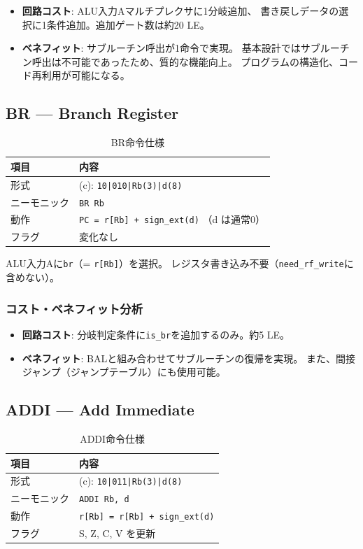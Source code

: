 \documentclass[a4paper,11pt]{ltjsarticle}
\begin{document}
\begin{itemize}
\item \textbf{回路コスト}: ALU入力Aマルチプレクサに1分岐追加、
  書き戻しデータの選択に1条件追加。追加ゲート数は約20 LE。
\item \textbf{ベネフィット}: サブルーチン呼出が1命令で実現。
  基本設計ではサブルーチン呼出は不可能であったため、質的な機能向上。
  プログラムの構造化、コード再利用が可能になる。
\end{itemize}

\subsection{BR — Branch Register}

\begin{table}[h]
\centering
\caption{BR命令仕様}
\begin{tabular}{ll}
\toprule
項目 & 内容 \\
\midrule
形式        & (c): \texttt{10|010|Rb(3)|d(8)} \\
ニーモニック & \texttt{BR Rb} \\
動作        & \texttt{PC = r[Rb] + sign\_ext(d)} （d は通常0）\\
フラグ      & 変化なし \\
\bottomrule
\end{tabular}
\end{table}

ALU入力Aに\texttt{br}（= \texttt{r[Rb]}）を選択。
レジスタ書き込み不要（\texttt{need\_rf\_write}に含めない）。

\subsubsection{コスト・ベネフィット分析}

\begin{itemize}
\item \textbf{回路コスト}: 分岐判定条件に\texttt{is\_br}を追加するのみ。約5 LE。
\item \textbf{ベネフィット}: BALと組み合わせてサブルーチンの復帰を実現。
  また、間接ジャンプ（ジャンプテーブル）にも使用可能。
\end{itemize}

\subsection{ADDI — Add Immediate}

\begin{table}[h]
\centering
\caption{ADDI命令仕様}
\begin{tabular}{ll}
\toprule
項目 & 内容 \\
\midrule
形式        & (c): \texttt{10|011|Rb(3)|d(8)} \\
ニーモニック & \texttt{ADDI Rb, d} \\
動作        & \texttt{r[Rb] = r[Rb] + sign\_ext(d)} \\
フラグ      & S, Z, C, V を更新 \\
\bottomrule
\end{tabular}
\end{table}
\end{document}
